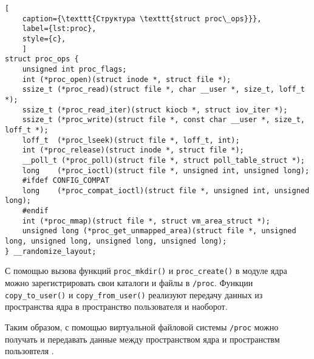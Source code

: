 \begin{lstlisting}[
	caption={\texttt{Cтруктура \texttt{struct proc\_ops}}},
	label={lst:proc},
	style={c},
	]
struct proc_ops {
	unsigned int proc_flags;
	int	(*proc_open)(struct inode *, struct file *);
	ssize_t	(*proc_read)(struct file *, char __user *, size_t, loff_t *);
	ssize_t (*proc_read_iter)(struct kiocb *, struct iov_iter *);
	ssize_t	(*proc_write)(struct file *, const char __user *, size_t, loff_t *);
	loff_t	(*proc_lseek)(struct file *, loff_t, int);
	int	(*proc_release)(struct inode *, struct file *);
	__poll_t (*proc_poll)(struct file *, struct poll_table_struct *);
	long	(*proc_ioctl)(struct file *, unsigned int, unsigned long);
	#ifdef CONFIG_COMPAT
	long	(*proc_compat_ioctl)(struct file *, unsigned int, unsigned long);
	#endif
	int	(*proc_mmap)(struct file *, struct vm_area_struct *);
	unsigned long (*proc_get_unmapped_area)(struct file *, unsigned long, unsigned long, unsigned long, unsigned long);
} __randomize_layout;
\end{lstlisting}

С помощью вызова функций \texttt{proc\_mkdir()} и \texttt{proc\_create()} в модуле ядра можно зарегистрировать свои каталоги и файлы в \texttt{/proc}. Функции \texttt{copy\_to\_user()} и \texttt{copy\_from\_user()} реализуют передачу данных из пространства ядра в пространство пользователя и наоборот.

Таким образом, с помощью виртуальной файловой системы \texttt{/proc} можно получать и передавать данные между пространством ядра и пространствм пользовтеля .


